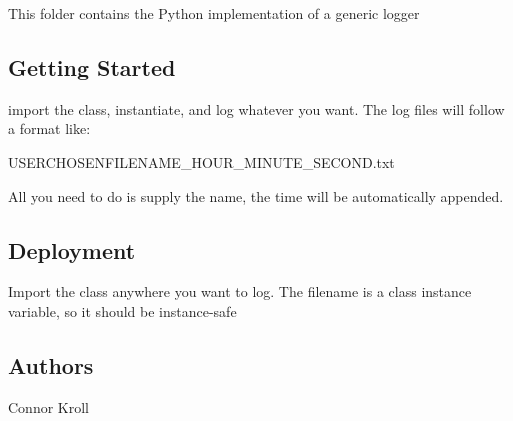 This folder contains the Python implementation of a generic logger

\subsection*{Getting Started}

import the class, instantiate, and log whatever you want. The log files will follow a format like\+: 
\begin{DoxyCode}
USERCHOSENFILENAME\_HOUR\_MINUTE\_SECOND.txt
\end{DoxyCode}
 All you need to do is supply the name, the time will be automatically appended.

\subsection*{Deployment}

Import the class anywhere you want to log. The filename is a class instance variable, so it should be instance-\/safe

\subsection*{Authors}


\begin{DoxyItemize}
\item Connor Kroll 
\end{DoxyItemize}